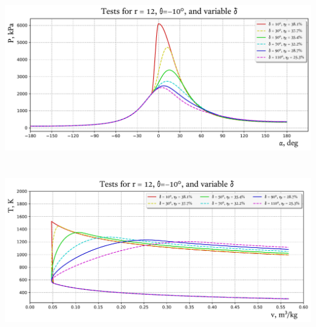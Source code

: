     \begin{frame}{}\vspace*{-2em}
        \begin{center}
            \includegraphics[height=70.0mm]{fig/test_r=12,0_speed-a.pdf}
        \end{center}
    \end{frame}

    \begin{frame}{}\vspace*{-2em}
        \begin{center}
            \includegraphics[height=70.0mm]{fig/test_r=12,0_speed-T.pdf}
        \end{center}
    \end{frame}

